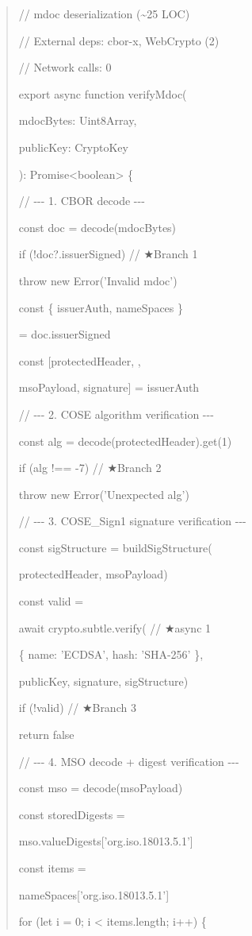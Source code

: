 \begin{quote}
// mdoc deserialization (\textasciitilde25 LOC)

// External deps: cbor-x, WebCrypto (2)

// Network calls: 0

export async function verifyMdoc(

mdocBytes: Uint8Array,

publicKey: CryptoKey

): Promise\textless boolean\textgreater{} \{

// -\/-\/- 1. CBOR decode -\/-\/-

const doc = decode(mdocBytes)

if (!doc?.issuerSigned) // ★Branch 1

throw new Error('Invalid mdoc')

const \{ issuerAuth, nameSpaces \}

= doc.issuerSigned

const {[}protectedHeader, ,

msoPayload, signature{]} = issuerAuth

// -\/-\/- 2. COSE algorithm verification -\/-\/-

const alg = decode(protectedHeader).get(1)

if (alg !== -7) // ★Branch 2

throw new Error('Unexpected alg')

// -\/-\/- 3. COSE\_Sign1 signature verification -\/-\/-

const sigStructure = buildSigStructure(

protectedHeader, msoPayload)

const valid =

await crypto.subtle.verify( // ★async 1

\{ name: 'ECDSA', hash: 'SHA-256' \},

publicKey, signature, sigStructure)

if (!valid) // ★Branch 3

return false

// -\/-\/- 4. MSO decode + digest verification -\/-\/-

const mso = decode(msoPayload)

const storedDigests =

mso.valueDigests{[}'org.iso.18013.5.1'{]}

const items =

nameSpaces{[}'org.iso.18013.5.1'{]}

for (let i = 0; i \textless{} items.length; i++) \{


\end{quote}

